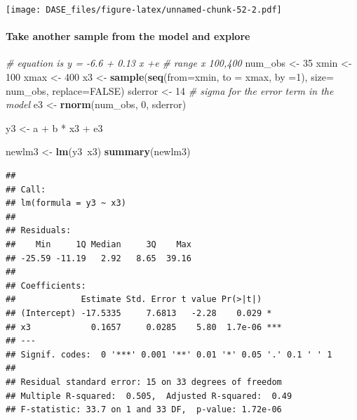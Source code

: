 \documentclass[]{book}
\newenvironment{Shaded}{\begin{snugshade}}{\end{snugshade}}
\newcommand{\KeywordTok}[1]{\textcolor[rgb]{0.13,0.29,0.53}{\textbf{{#1}}}}
\newcommand{\DataTypeTok}[1]{\textcolor[rgb]{0.13,0.29,0.53}{{#1}}}
\newcommand{\DecValTok}[1]{\textcolor[rgb]{0.00,0.00,0.81}{{#1}}}
\newcommand{\StringTok}[1]{\textcolor[rgb]{0.31,0.60,0.02}{{#1}}}
\newcommand{\CommentTok}[1]{\textcolor[rgb]{0.56,0.35,0.01}{\textit{{#1}}}}
\newcommand{\OtherTok}[1]{\textcolor[rgb]{0.56,0.35,0.01}{{#1}}}
\newcommand{\NormalTok}[1]{{#1}}
\let\oldparagraph\paragraph
\renewcommand{\paragraph}[1]{\oldparagraph{#1}\mbox{}}
\begin{document}
\texttt{[image: DASE\_files/figure-latex/unnamed-chunk-52-2.pdf]}

\paragraph{Take another sample from the model and
explore}\label{take-another-sample-from-the-model-and-explore}

\begin{Shaded}
\begin{Highlighting}[]
\CommentTok{# equation is  y = -6.6 + 0.13 x +e}
\CommentTok{# range x 100,400}
\NormalTok{num_obs <-}\StringTok{ }\DecValTok{35}
\NormalTok{xmin <-}\StringTok{ }\DecValTok{100}
\NormalTok{xmax <-}\StringTok{ }\DecValTok{400}
\NormalTok{x3 <-}\StringTok{ }\KeywordTok{sample}\NormalTok{(}\KeywordTok{seq}\NormalTok{(}\DataTypeTok{from=}\NormalTok{xmin, }\DataTypeTok{to =} \NormalTok{xmax, }\DataTypeTok{by =}\DecValTok{1}\NormalTok{), }\DataTypeTok{size=} \NormalTok{num_obs, }\DataTypeTok{replace=}\OtherTok{FALSE}\NormalTok{)}
\NormalTok{sderror <-}\StringTok{ }\DecValTok{14} \CommentTok{# sigma for the error term in the model}
\NormalTok{e3 <-}\StringTok{ }\KeywordTok{rnorm}\NormalTok{(num_obs, }\DecValTok{0}\NormalTok{, sderror) }

\NormalTok{y3 <-}\StringTok{ }\NormalTok{a +}\StringTok{ }\NormalTok{b *}\StringTok{ }\NormalTok{x3 +}\StringTok{ }\NormalTok{e3}

\NormalTok{newlm3 <-}\StringTok{ }\KeywordTok{lm}\NormalTok{(y3~x3)}
\KeywordTok{summary}\NormalTok{(newlm3)}
\end{Highlighting}
\end{Shaded}

\begin{verbatim}
## 
## Call:
## lm(formula = y3 ~ x3)
## 
## Residuals:
##    Min     1Q Median     3Q    Max 
## -25.59 -11.19   2.92   8.65  39.16 
## 
## Coefficients:
##             Estimate Std. Error t value Pr(>|t|)    
## (Intercept) -17.5335     7.6813   -2.28    0.029 *  
## x3            0.1657     0.0285    5.80  1.7e-06 ***
## ---
## Signif. codes:  0 '***' 0.001 '**' 0.01 '*' 0.05 '.' 0.1 ' ' 1
## 
## Residual standard error: 15 on 33 degrees of freedom
## Multiple R-squared:  0.505,  Adjusted R-squared:  0.49 
## F-statistic: 33.7 on 1 and 33 DF,  p-value: 1.72e-06
\end{verbatim}
\end{document}
